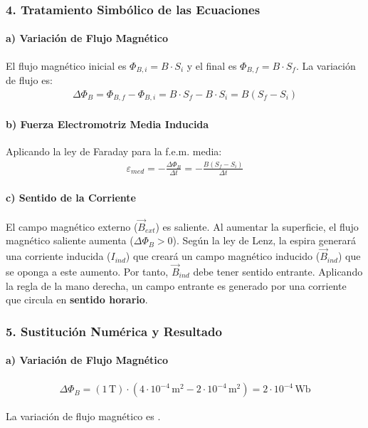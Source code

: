 \subsubsection*{4. Tratamiento Simbólico de las Ecuaciones}
\paragraph*{a) Variación de Flujo Magnético}
El flujo magnético inicial es $\Phi_{B,i} = B \cdot S_i$ y el final es $\Phi_{B,f} = B \cdot S_f$. La variación de flujo es:
\begin{gather}
    \Delta \Phi_B = \Phi_{B,f} - \Phi_{B,i} = B \cdot S_f - B \cdot S_i = B (S_f - S_i)
\end{gather}
\paragraph*{b) Fuerza Electromotriz Media Inducida}
Aplicando la ley de Faraday para la f.e.m. media:
\begin{gather}
    \varepsilon_{med} = - \frac{\Delta \Phi_B}{\Delta t} = - \frac{B (S_f - S_i)}{\Delta t}
\end{gather}
\paragraph*{c) Sentido de la Corriente}
El campo magnético externo ($\vec{B}_{ext}$) es saliente. Al aumentar la superficie, el flujo magnético saliente aumenta ($\Delta \Phi_B > 0$). Según la ley de Lenz, la espira generará una corriente inducida ($I_{ind}$) que creará un campo magnético inducido ($\vec{B}_{ind}$) que se oponga a este aumento. Por tanto, $\vec{B}_{ind}$ debe tener sentido entrante. Aplicando la regla de la mano derecha, un campo entrante es generado por una corriente que circula en \textbf{sentido horario}.

\subsubsection*{5. Sustitución Numérica y Resultado}
\paragraph*{a) Variación de Flujo Magnético}
\begin{gather}
    \Delta \Phi_B = (1 \, \text{T}) \cdot (4 \cdot 10^{-4} \, \text{m}^2 - 2 \cdot 10^{-4} \, \text{m}^2) = 2 \cdot 10^{-4} \, \text{Wb}
\end{gather}
\begin{cajaresultado}
    La variación de flujo magnético es .
\end{cajaresultado}

